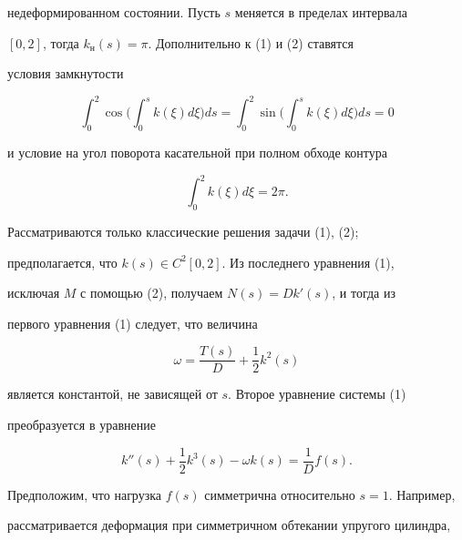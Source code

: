 недеформированном состоянии. Пусть $s$ меняется в пределах интервала


$[0,2]$, тогда $k_н(s)=\pi$. Дополнительно к (1) и (2) ставятся


условия замкнутости


\begin{equation}


\int_0^2 \cos \bigg(\int_0^s k (\xi)d \xi \bigg) ds=


\int_0^2 \sin \bigg(\int_0^s k (\xi)d \xi \bigg) ds=0


\end{equation}


и условие на угол поворота касательной при полном обходе контура


\begin{equation}


\int_0^2 k (\xi) d \xi=2 \pi.


\end{equation}





Рассматриваются только классические решения задачи (1), (2);


предполагается, что $k(s) \in C^2 [0,2]$. Из последнего уравнения (1),


исключая $M$ с помощью (2), получаем $N(s)=D{k}'(s)$, и тогда из


первого уравнения (1) следует, что величина


\begin{equation}


\omega=\frac{T(s)}{D}+ \frac{1}{2}k^2(s)


\end{equation}


является константой, не зависящей от $s$. Второе уравнение системы (1)


преобразуется в уравнение


\begin{equation}


{k}''(s) + \frac{1}{2}k^3(s) - \omega k(s)=\frac{1}{D} f(s).


\end{equation}





Предположим, что нагрузка $f(s)$ симметрична относительно $s=1$. Например,


рассматривается деформация при симметричном обтекании упругого цилиндра,


